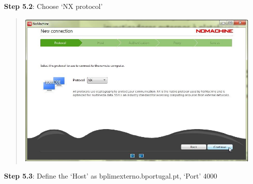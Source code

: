 \documentclass[
  11pt,
  a4paper,
]{article}
\begin{document}
\textbf{Step 5.2}: Choose `NX protocol'

\begin{quote}
\includegraphics[width=4.72441in,height=3.0302in]{./media/image27.png}
\end{quote}

\textbf{Step 5.3}: Define the `Host' as bplimexterno.bportugal.pt,
`Port' 4000
\end{document}
